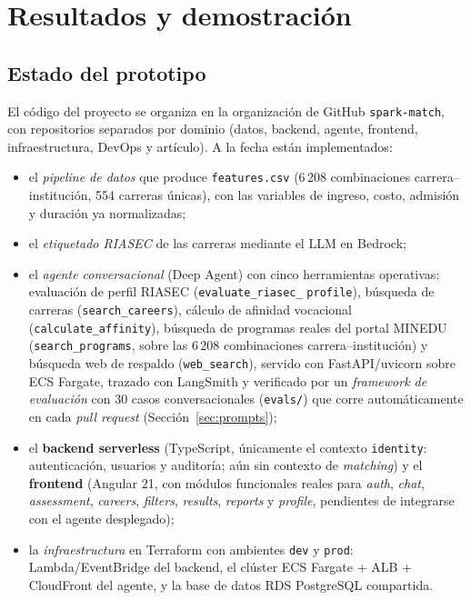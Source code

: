 \section{Resultados y demostraci\'on}
\label{sec:results}

\subsection{Estado del prototipo}

El c\'odigo del proyecto se organiza en la organizaci\'on de GitHub
\texttt{spark-match}, con repositorios separados por dominio (datos, backend,
agente, frontend, infraestructura, DevOps y art\'iculo). A la fecha est\'an
implementados:

\begin{itemize}[noitemsep]
  \item el \emph{pipeline de datos} que produce \texttt{features.csv} (6\,208
        combinaciones carrera--instituci\'on, 554 carreras \'unicas), con las
        variables de ingreso, costo, admisi\'on y duraci\'on ya normalizadas;
  \item el \emph{etiquetado RIASEC} de las carreras mediante el LLM en Bedrock;
  \item el \emph{agente conversacional} (Deep Agent) con cinco herramientas
        operativas: evaluaci\'on de perfil RIASEC (\texttt{evaluate\_riasec\_}
        \texttt{profile}), b\'usqueda de carreras (\texttt{search\_careers}),
        c\'alculo de afinidad vocacional (\texttt{calculate\_affinity}),
        b\'usqueda de programas reales del portal MINEDU
        (\texttt{search\_programs}, sobre las 6\,208 combinaciones
        carrera--instituci\'on) y b\'usqueda web de respaldo
        (\texttt{web\_search}), servido con FastAPI/uvicorn sobre ECS Fargate,
        trazado con LangSmith y verificado por un \emph{framework de
        evaluaci\'on} con 30 casos conversacionales (\texttt{evals/}) que
        corre autom\'aticamente en cada \emph{pull request}
        (Secci\'on~\ref{sec:prompts});
  \item el \textbf{backend serverless} (TypeScript, \'unicamente el contexto
        \texttt{identity}: autenticaci\'on, usuarios y auditor\'ia; a\'un sin
        contexto de \emph{matching}) y el \textbf{frontend} (Angular 21, con
        m\'odulos funcionales reales para \emph{auth}, \emph{chat},
        \emph{assessment}, \emph{careers}, \emph{filters}, \emph{results},
        \emph{reports} y \emph{profile}, pendientes de integrarse con el
        agente desplegado);
  \item la \emph{infraestructura} en Terraform con ambientes \texttt{dev} y
        \texttt{prod}: Lambda/EventBridge del backend, el cl\'uster ECS
        Fargate + ALB + CloudFront del agente, y la base de datos RDS
        PostgreSQL compartida.
\end{itemize}

